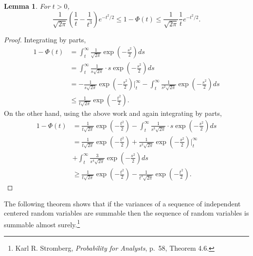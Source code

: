 \documentclass{article}
\newtheorem{lemma}[theorem]{Lemma}
\theoremstyle{definition}
\begin{document}
\begin{lemma}
For $t>0$,
\[
\frac{1}{\sqrt{2\pi}} \left(\frac{1}{t}-\frac{1}{t^3}\right) e^{-t^2/2} \leq 1- \Phi(t) \leq \frac{1}{\sqrt{2\pi}} \frac{1}{t} e^{-t^2/2}.
\]
\end{lemma}
\begin{proof}
Integrating by parts,
\begin{align*}
1-\Phi(t) &= \int_t^\infty \frac{1}{\sqrt{2\pi}} \exp\left(- \frac{s^2}{2} \right) ds\\
&=\int_t^\infty \frac{1}{s \sqrt{2\pi}} \cdot s\exp\left(- \frac{s^2}{2} \right) ds\\
&=- \frac{1}{s\sqrt{2\pi}} \exp\left(- \frac{s^2}{2} \right) \bigg|_t^\infty
-\int_t^\infty \frac{1}{s^2 \sqrt{2\pi}}  \exp\left(- \frac{s^2}{2} \right) ds\\
&\leq \frac{1}{t\sqrt{2\pi}} \exp\left(-\frac{t^2}{2} \right).
\end{align*}
On the other hand, using the above work and again integrating by parts,
\begin{align*}
1-\Phi(t) &= \frac{1}{t\sqrt{2\pi}} \exp\left(-\frac{t^2}{2} \right)-\int_t^\infty \frac{1}{s^3 \sqrt{2\pi}} \cdot s  \exp\left(- \frac{s^2}{2} \right) ds\\
&=\frac{1}{t\sqrt{2\pi}} \exp\left(-\frac{t^2}{2} \right) +
\frac{1}{s^3 \sqrt{2\pi}} \exp\left(-\frac{s^2}{2} \right) \bigg|_t^\infty\\
&+\int_t^\infty \frac{3}{s^4\sqrt{2\pi}} \exp\left(-\frac{s^2}{2} \right) ds\\
&\geq \frac{1}{t\sqrt{2\pi}} \exp\left(-\frac{t^2}{2} \right) - \frac{1}{t^3 \sqrt{2\pi}} \exp\left(-\frac{t^2}{2} \right).
\end{align*}
\end{proof}

The following theorem shows that if the variances of a sequence of independent centered random variables
are summable then the sequence of random variables is summable almost surely.\footnote{Karl R. Stromberg, {\em Probability for Analysts}, p.~58, Theorem 4.6.} 
\end{document}
